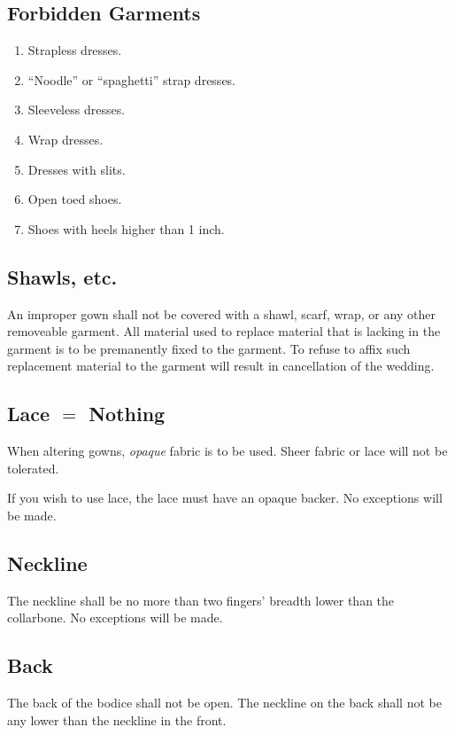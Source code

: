 \documentclass{article}
\begin{document}
\subsection{Forbidden Garments}

\begin{enumerate}
    \item Strapless dresses.
    \item ``Noodle'' or ``spaghetti'' strap dresses.
    \item Sleeveless dresses.
    \item Wrap dresses.
    \item Dresses with slits.
    \item Open toed shoes.
    \item Shoes with heels higher than 1 inch.
\end{enumerate}

\subsection{Shawls, etc.}

An improper gown shall not be covered with a shawl, scarf, wrap, or any other
removeable garment. All material used to replace material that is lacking in
the garment is to be premanently fixed to the garment. To refuse to affix such
replacement material to the garment will result in cancellation of the wedding.

\subsection{Lace $=$ Nothing}

When altering gowns, \textit{opaque} fabric is to be used. Sheer fabric or lace
will not be tolerated.

If you wish to use lace, the lace must have an opaque backer. No exceptions will
be made.

\subsection{Neckline}

The neckline shall be no more than two fingers' breadth lower
than the collarbone. No exceptions will be made.

\subsection{Back}

The back of the bodice shall not be open. The neckline on the back shall not be
any lower than the neckline in the front.
\end{document}
